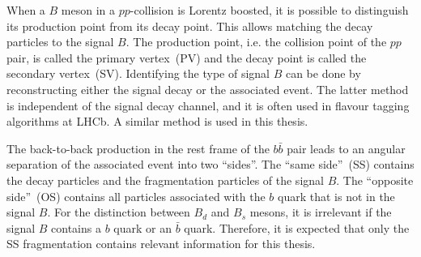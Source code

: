When a $B$ meson in a $pp$-collision is Lorentz boosted, it is possible to distinguish its production point from its decay point.
This allows matching the decay particles to the signal $B$.
The production point, i.e. the collision point of the $pp$ pair, is called the primary vertex~(PV) and the decay point is called the secondary vertex~(SV).
Identifying the type of signal $B$ can be done by reconstructing either the signal decay or the associated event. 
The latter method is independent of the signal decay channel, and it is often used in flavour tagging algorithms at LHCb. 
A similar method is used in this thesis.

The back-to-back production in the rest frame of the $b\bar{b}$ pair leads to an angular separation of the associated event into two \enquote{sides}.
The \enquote{same side}~(SS) contains the decay particles and the fragmentation particles of the signal $B$.
The \enquote{opposite side}~(OS) contains all particles associated with the $b$ quark that is not in the signal $B$.
For the distinction between $B_d$ and $B_s$ mesons, it is irrelevant if the signal $B$ contains a $b$ quark or an $\bar{b}$ quark.
Therefore, it is expected that only the SS fragmentation contains relevant information for this thesis. %
